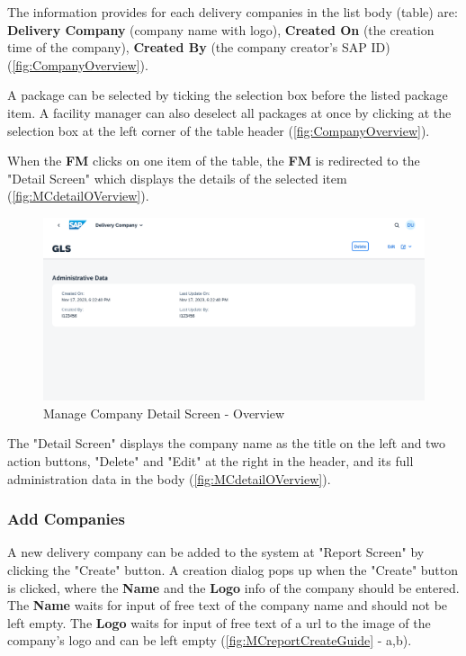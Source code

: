 The information provides for each delivery companies in the list body (table) are: \textbf{Delivery Company} (company name with logo), \textbf{Created On} (the creation time of the company), \textbf{Created By} (the company creator's SAP ID) (\autoref{fig:CompanyOverview}). 

A package can be selected by ticking the selection box before the listed package item. A facility manager can also deselect all packages at once by clicking at the selection box at the left corner of the table header (\autoref{fig:CompanyOverview}). 

\bigskip

When the \textbf{FM} clicks on one item of the table, the \textbf{FM} is redirected to the "Detail Screen" which displays the details of the selected item (\autoref{fig:MCdetailOVerview}). 

\begin{figure}[H]
	\centering
	\includegraphics[width=1\linewidth]{images/user_doc/company/detail/DetailOverview.png}
	\caption{Manage Company Detail Screen - Overview}
	\label{fig:MCdetailOVerview}
\end{figure}

The "Detail Screen" displays the company name as the title on the left and two action buttons, "Delete" and "Edit" at the right in the header, and its full administration data in the body (\autoref{fig:MCdetailOVerview}). 

\subsubsection{Add Companies}

A new delivery company can be added to the system at "Report Screen" by clicking the "Create" button. 
A creation dialog pops up when the "Create" button is clicked, where the \textbf{Name} and the \textbf{Logo} info of the company should be entered. The \textbf{Name} waits for input of free text of the company name and should not be left empty. The \textbf{Logo} waits for input of free text of a url to the image of the company's logo and can be left empty (\autoref{fig:MCreportCreateGuide} - a,b). 

